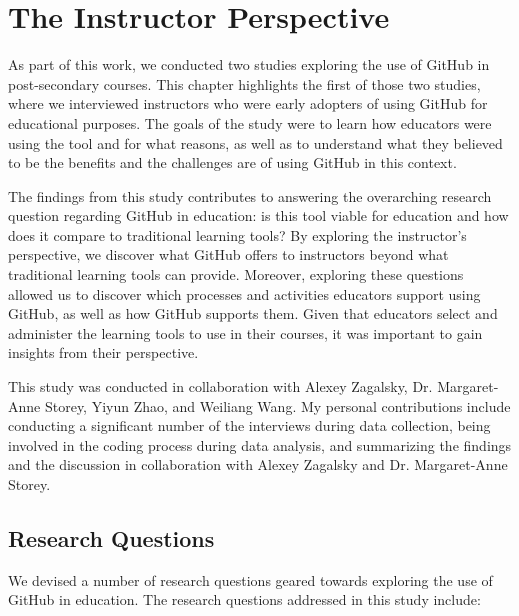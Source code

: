 \chapter{The Instructor Perspective}
As part of this work, we conducted two studies exploring the use of GitHub in post-secondary courses. This chapter highlights the first of those two studies, where we interviewed instructors who were early adopters of using GitHub for educational purposes. The goals of the study were to learn how educators were using the tool and for what reasons, as well as to understand what they believed to be the benefits and the challenges are of using GitHub in this context.

The findings from this study contributes to answering the overarching research question regarding GitHub in education: is this tool viable for education and how does it compare to traditional learning tools? By exploring the instructor's perspective, we discover what GitHub offers to instructors beyond what traditional learning tools can provide. Moreover, exploring these questions allowed us to discover which processes and activities educators support using GitHub, as well as how GitHub supports them. Given that educators select and administer the learning tools to use in their courses, it was important to gain insights from their perspective.

This study was conducted in collaboration with Alexey Zagalsky, Dr. Margaret-Anne Storey, Yiyun Zhao, and Weiliang Wang. My personal contributions include conducting a significant number of the interviews during data collection, being involved in the coding process during data analysis, and summarizing the findings and the discussion in collaboration with Alexey Zagalsky and Dr. Margaret-Anne Storey. %


\section{Research Questions}
We devised a number of research questions geared towards exploring the use of GitHub in education. The research questions addressed in this study include:

